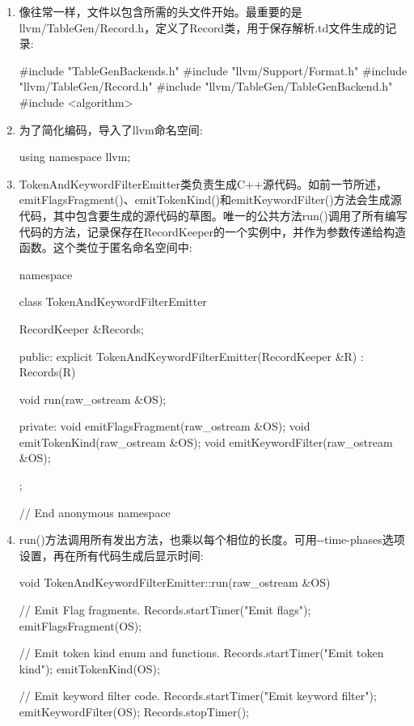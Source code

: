 \begin{enumerate}
\item
像往常一样，文件以包含所需的头文件开始。最重要的是llvm/TableGen/Record.h，定义了Record类，用于保存解析.td文件生成的记录:

\begin{cpp}
#include "TableGenBackends.h"
#include "llvm/Support/Format.h"
#include "llvm/TableGen/Record.h"
#include "llvm/TableGen/TableGenBackend.h"
#include <algorithm>
\end{cpp}

\item
为了简化编码，导入了llvm命名空间:

\begin{cpp}
using namespace llvm;
\end{cpp}

\item
TokenAndKeywordFilterEmitter类负责生成C++源代码。如前一节所述，emitFlagsFragment()、emitTokenKind()和emitKeywordFilter()方法会生成源代码，其中包含要生成的源代码的草图。唯一的公共方法run()调用了所有编写代码的方法，记录保存在RecordKeeper的一个实例中，并作为参数传递给构造函数。这个类位于匿名命名空间中:

\begin{cpp}
namespace {
class TokenAndKeywordFilterEmitter {
    RecordKeeper &Records;

public:
    explicit TokenAndKeywordFilterEmitter(RecordKeeper &R)
        : Records(R) {}

    void run(raw_ostream &OS);

private:
    void emitFlagsFragment(raw_ostream &OS);
    void emitTokenKind(raw_ostream &OS);
    void emitKeywordFilter(raw_ostream &OS);
};
} // End anonymous namespace
\end{cpp}

\item
run()方法调用所有发出方法，也乘以每个相位的长度。可用-{}-time-phases选项设置，再在所有代码生成后显示时间:

\begin{cpp}
void TokenAndKeywordFilterEmitter::run(raw_ostream &OS) {
    // Emit Flag fragments.
    Records.startTimer("Emit flags");
    emitFlagsFragment(OS);

    // Emit token kind enum and functions.
    Records.startTimer("Emit token kind");
    emitTokenKind(OS);

    // Emit keyword filter code.
    Records.startTimer("Emit keyword filter");
    emitKeywordFilter(OS);
    Records.stopTimer();
}
\end{cpp}


\end{enumerate}
